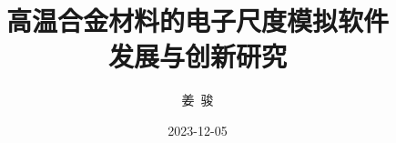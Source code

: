 
\title{\textbf{高温合金材料的电子尺度模拟软件\\发展与创新研究}}
\author[ ]{姜~骏}   %
\renewcommand*{\Authfont}{\small\rm} %
\renewcommand*{\Affilfont}{\small\it} %
\renewcommand\Authands{ and } %
\renewcommand\Authands{ , } %
\date{} %
\date{2023-12-05}									     %


\maketitle
\thispagestyle{fancy}   %
